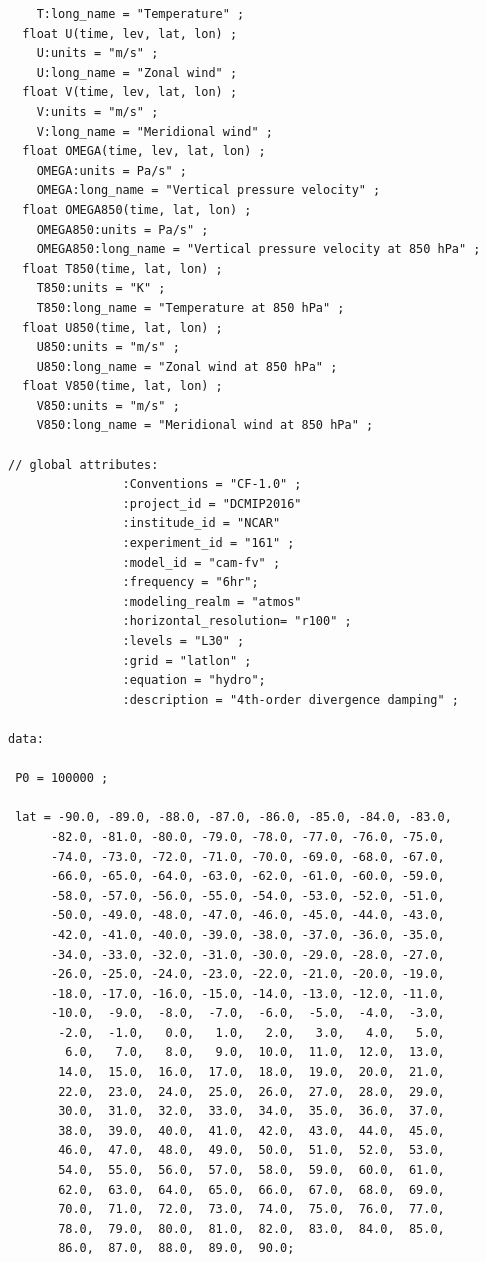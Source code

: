 \documentclass[times,doublespace]{fldauth}
\begin{document}
{\begin{appendix}
\begin{verbatim}
    T:long_name = "Temperature" ;
  float U(time, lev, lat, lon) ;
    U:units = "m/s" ;
    U:long_name = "Zonal wind" ;
  float V(time, lev, lat, lon) ;
    V:units = "m/s" ;
    V:long_name = "Meridional wind" ;
  float OMEGA(time, lev, lat, lon) ;
    OMEGA:units = Pa/s" ;
    OMEGA:long_name = "Vertical pressure velocity" ;
  float OMEGA850(time, lat, lon) ;
    OMEGA850:units = Pa/s" ;
    OMEGA850:long_name = "Vertical pressure velocity at 850 hPa" ;
  float T850(time, lat, lon) ;
    T850:units = "K" ;
    T850:long_name = "Temperature at 850 hPa" ;
  float U850(time, lat, lon) ;
    U850:units = "m/s" ;
    U850:long_name = "Zonal wind at 850 hPa" ;
  float V850(time, lat, lon) ;
    V850:units = "m/s" ;
    V850:long_name = "Meridional wind at 850 hPa" ;
    
// global attributes:
                :Conventions = "CF-1.0" ;
                :project_id = "DCMIP2016"
                :institude_id = "NCAR"
                :experiment_id = "161" ;
                :model_id = "cam-fv" ;
                :frequency = "6hr";
                :modeling_realm = "atmos"
                :horizontal_resolution= "r100" ;
                :levels = "L30" ;
                :grid = "latlon" ;
                :equation = "hydro";
                :description = "4th-order divergence damping" ;

data:

 P0 = 100000 ;

 lat = -90.0, -89.0, -88.0, -87.0, -86.0, -85.0, -84.0, -83.0, 
      -82.0, -81.0, -80.0, -79.0, -78.0, -77.0, -76.0, -75.0, 
      -74.0, -73.0, -72.0, -71.0, -70.0, -69.0, -68.0, -67.0, 
      -66.0, -65.0, -64.0, -63.0, -62.0, -61.0, -60.0, -59.0, 
      -58.0, -57.0, -56.0, -55.0, -54.0, -53.0, -52.0, -51.0, 
      -50.0, -49.0, -48.0, -47.0, -46.0, -45.0, -44.0, -43.0, 
      -42.0, -41.0, -40.0, -39.0, -38.0, -37.0, -36.0, -35.0, 
      -34.0, -33.0, -32.0, -31.0, -30.0, -29.0, -28.0, -27.0, 
      -26.0, -25.0, -24.0, -23.0, -22.0, -21.0, -20.0, -19.0, 
      -18.0, -17.0, -16.0, -15.0, -14.0, -13.0, -12.0, -11.0, 
      -10.0,  -9.0,  -8.0,  -7.0,  -6.0,  -5.0,  -4.0,  -3.0, 
       -2.0,  -1.0,   0.0,   1.0,   2.0,   3.0,   4.0,   5.0, 
        6.0,   7.0,   8.0,   9.0,  10.0,  11.0,  12.0,  13.0, 
       14.0,  15.0,  16.0,  17.0,  18.0,  19.0,  20.0,  21.0, 
       22.0,  23.0,  24.0,  25.0,  26.0,  27.0,  28.0,  29.0, 
       30.0,  31.0,  32.0,  33.0,  34.0,  35.0,  36.0,  37.0, 
       38.0,  39.0,  40.0,  41.0,  42.0,  43.0,  44.0,  45.0, 
       46.0,  47.0,  48.0,  49.0,  50.0,  51.0,  52.0,  53.0, 
       54.0,  55.0,  56.0,  57.0,  58.0,  59.0,  60.0,  61.0, 
       62.0,  63.0,  64.0,  65.0,  66.0,  67.0,  68.0,  69.0, 
       70.0,  71.0,  72.0,  73.0,  74.0,  75.0,  76.0,  77.0, 
       78.0,  79.0,  80.0,  81.0,  82.0,  83.0,  84.0,  85.0, 
       86.0,  87.0,  88.0,  89.0,  90.0;


\end{verbatim}
\end{appendix}}
\end{document}
